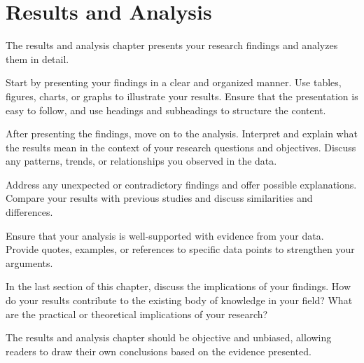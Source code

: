 \chapter{Results and Analysis}

The results and analysis chapter presents your research findings and analyzes them in detail.

Start by presenting your findings in a clear and organized manner. Use tables, figures, charts, or graphs to illustrate your results. Ensure that the presentation is easy to follow, and use headings and subheadings to structure the content.

After presenting the findings, move on to the analysis. Interpret and explain what the results mean in the context of your research questions and objectives. Discuss any patterns, trends, or relationships you observed in the data.

Address any unexpected or contradictory findings and offer possible explanations. Compare your results with previous studies and discuss similarities and differences.

Ensure that your analysis is well-supported with evidence from your data. Provide quotes, examples, or references to specific data points to strengthen your arguments.

In the last section of this chapter, discuss the implications of your findings. How do your results contribute to the existing body of knowledge in your field? What are the practical or theoretical implications of your research?

The results and analysis chapter should be objective and unbiased, allowing readers to draw their own conclusions based on the evidence presented.

